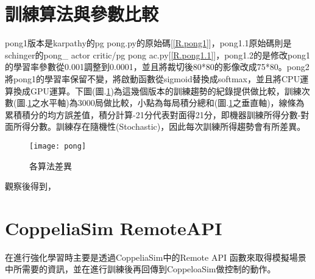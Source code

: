 \section{訓練算法與參數比較}
 pong1版本是karpathy的pg\- pong.py的原始碼[\ref{R.pong1}]，pong1.1原始碼則是schinger的pong\_ actor\- critic/pg\- pong\- ac.py[\ref{R.pong1.1}]，pong1.2的是修改pong1的學習率參數從0.001調整到0.0001，並且將裁切後80*80的影像改成75*80。pong2將pong1的學習率保留不變，將啟動函數從sigmoid替換成softmax，並且將CPU運算換成GPU運算。下圖(圖.\ref{fig.比較中斷數據})為這幾個版本的訓練趨勢的紀錄提供做比較，訓練次數(圖.\ref{fig.比較中斷數據}之水平軸)為3000局做比較，小點為每局積分總和(圖.\ref{fig.比較中斷數據}之垂直軸)，線條為累積積分的均方誤差值，積分計算-21分代表對面得21分，即機器訓練所得分數-對面所得分數。訓練存在隨機性(Stochastic)，因此每次訓練所得趨勢會有所差異。
\begin{table}[hbt!]
\center\large
{}
\caption{\Large 算法標示}
\end{table}

\begin{figure}[hbt!]
\begin{center}
\texttt{[image: pong]}
\caption{\Large 各算法差異}
\label{fig.比較中斷數據}
\end{center}
\end{figure}
觀察後得到，
 
\section{CoppeliaSim RemoteAPI}
在進行強化學習時主要是透過CoppeliaSim中的Remote API 函數來取得模擬場景中所需要的資訊，並在進行訓練後再回傳到CoppeloaSim做控制的動作。\\
